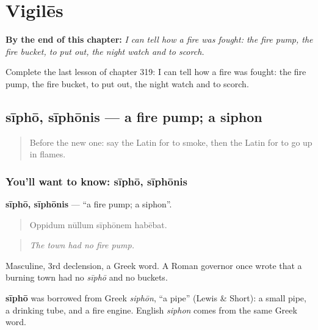 
\chapter{Vigilēs}
\label{ch:la-vigiles}

\begin{chapteropening}
\textbf{By the end of this chapter:} \emph{I can tell how a fire was fought: the fire pump, the fire bucket, to put out, the night watch and to scorch.}

Complete the last lesson of chapter 319: I can tell how a fire was fought: the fire pump, the fire bucket, to put out, the night watch and to scorch.
\end{chapteropening}

\section[sīphō, sīphōnis]{sīphō, sīphōnis — a fire pump; a siphon}

\label{lesson:LA-C319-sipho}



\begin{quote}
Before the new one: say the Latin for to smoke, then the Latin for to go up in flames.
\end{quote}

\subsection*{You'll want to know: sīphō, sīphōnis}
\textbf{sīphō, sīphōnis} — \textquotedblleft{}a fire pump; a siphon\textquotedblright{}.

\begin{quote}
Oppidum nūllum sīphōnem habēbat.
\end{quote}

\begin{quote}
\emph{The town had no fire pump.}
\end{quote}

Masculine, 3rd declension, a Greek word. A Roman governor once wrote that a burning town had no \emph{sīphō} and no buckets.

\begin{cousinweb}
\textbf{sīphō} was borrowed from Greek \emph{siphōn}, \textquotedblleft{}a pipe\textquotedblright{} (Lewis \& Short): a small pipe, a drinking tube, and a fire engine. English \emph{siphon} comes from the same Greek word.
\end{cousinweb}

